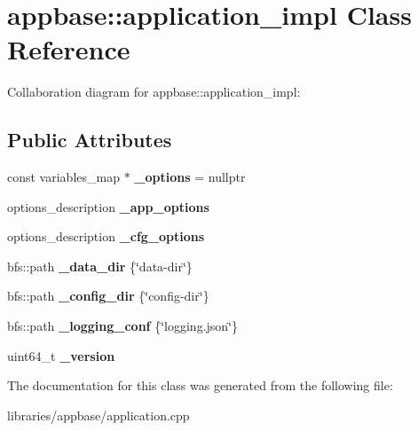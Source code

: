 \hypertarget{classappbase_1_1application__impl}{}\section{appbase\+:\+:application\+\_\+impl Class Reference}
\label{classappbase_1_1application__impl}


Collaboration diagram for appbase\+:\+:application\+\_\+impl\+:
\subsection*{Public Attributes}
\begin{DoxyCompactItemize}
\item 
\mbox{\label{classappbase_1_1application__impl_a870e644c513c9c58f4f69490e3e3c7af}} 
const variables\+\_\+map $\ast$ {\bfseries \+\_\+options} = nullptr
\item 
\mbox{\label{classappbase_1_1application__impl_aeaad17ab2e8496dfcddcde22001f71e9}} 
options\+\_\+description {\bfseries \+\_\+app\+\_\+options}
\item 
\mbox{\label{classappbase_1_1application__impl_a4679e6fc2486345acb6fceb7ed836b57}} 
options\+\_\+description {\bfseries \+\_\+cfg\+\_\+options}
\item 
\mbox{\label{classappbase_1_1application__impl_a16991047b49dae072cec342862666ded}} 
bfs\+::path {\bfseries \+\_\+data\+\_\+dir} \{\char`\"{}data-\/dir\char`\"{}\}
\item 
\mbox{\label{classappbase_1_1application__impl_aadb245a4b7200b02559678b7297c4796}} 
bfs\+::path {\bfseries \+\_\+config\+\_\+dir} \{\char`\"{}config-\/dir\char`\"{}\}
\item 
\mbox{\label{classappbase_1_1application__impl_ab72d2102d709f8fec17cd87c4e1fcacb}} 
bfs\+::path {\bfseries \+\_\+logging\+\_\+conf} \{\char`\"{}logging.\+json\char`\"{}\}
\item 
\mbox{\label{classappbase_1_1application__impl_a01df2a4f435ae8dd80599748419071f3}} 
uint64\+\_\+t {\bfseries \+\_\+version}
\end{DoxyCompactItemize}


The documentation for this class was generated from the following file\+:\begin{DoxyCompactItemize}
\item 
libraries/appbase/application.\+cpp\end{DoxyCompactItemize}
